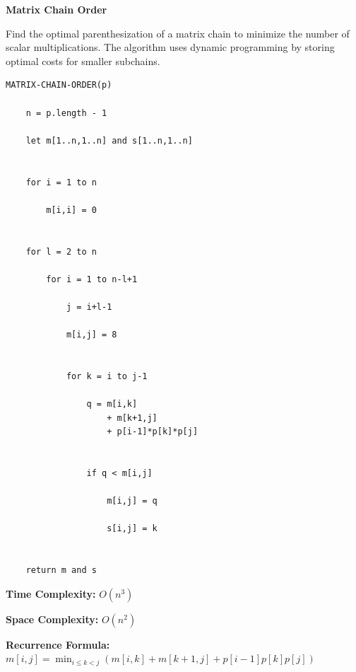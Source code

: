 \documentclass[a4paper,12pt]{article}
\begin{document}
\begin{tcolorbox}[
    colback=gray!30,
    colframe=black,
    boxrule=1pt,
    arc=0mm
]

\begin{tcolorbox}[
    colback=gray!10,
    colframe=black,
    arc=0mm
]
\centering
{\Huge\bfseries Matrix Chain Order}
\end{tcolorbox}


\begin{tcolorbox}[
    colback=gray!10,
    colframe=black,
    arc=0mm
]
\small
Find the optimal parenthesization of a matrix chain to minimize
the number of scalar multiplications.
The algorithm uses dynamic programming by storing optimal costs
for smaller subchains.
\end{tcolorbox}


\begin{tcolorbox}[
    colback=black!5,
    colframe=black,
    arc=0mm,
    title=Pseudo-code
]
\tiny
\begin{lstlisting}
MATRIX-CHAIN-ORDER(p)

    n = p.length - 1

    let m[1..n,1..n] and s[1..n,1..n]


    for i = 1 to n

        m[i,i] = 0


    for l = 2 to n

        for i = 1 to n-l+1

            j = i+l-1

            m[i,j] = 8


            for k = i to j-1

                q = m[i,k]
                    + m[k+1,j]
                    + p[i-1]*p[k]*p[j]


                if q < m[i,j]

                    m[i,j] = q

                    s[i,j] = k


    return m and s
\end{lstlisting}
\end{tcolorbox}


\begin{tcolorbox}[
    colback=cyan!20,
    colframe=black,
    arc=0mm
]
\small
\textbf{Time Complexity:}
$O(n^3)$
\end{tcolorbox}


\begin{tcolorbox}[
    colback=violet!20,
    colframe=black,
    arc=0mm
]
\small
\textbf{Space Complexity:}
$O(n^2)$
\end{tcolorbox}


\begin{tcolorbox}[
    colback=pink!20,
    colframe=black,
    arc=0mm
]
\small
\textbf{Recurrence Formula:}
$m[i,j]=\min_{i \leq k < j}
(m[i,k]+m[k+1,j]+p[i-1]p[k]p[j])$
\end{tcolorbox}

\end{tcolorbox}
\end{document}
